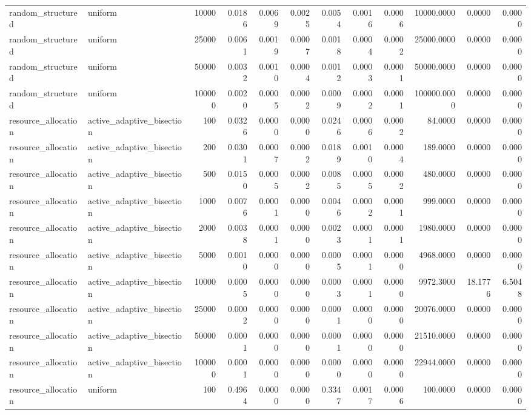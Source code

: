 \begin{tabular}{llrrrrrrrrrr}
random_structured & uniform & 10000 & 0.0186 & 0.0069 & 0.0025 & 0.0054 & 0.0016 & 0.0006 & 10000.0000 & 0.0000 & 0.0000 \\
random_structured & uniform & 25000 & 0.0061 & 0.0019 & 0.0007 & 0.0018 & 0.0004 & 0.0002 & 25000.0000 & 0.0000 & 0.0000 \\
random_structured & uniform & 50000 & 0.0032 & 0.0010 & 0.0004 & 0.0012 & 0.0003 & 0.0001 & 50000.0000 & 0.0000 & 0.0000 \\
random_structured & uniform & 100000 & 0.0020 & 0.0005 & 0.0002 & 0.0009 & 0.0002 & 0.0001 & 100000.0000 & 0.0000 & 0.0000 \\
resource_allocation & active_adaptive_bisection & 100 & 0.0326 & 0.0000 & 0.0000 & 0.0246 & 0.0006 & 0.0002 & 84.0000 & 0.0000 & 0.0000 \\
resource_allocation & active_adaptive_bisection & 200 & 0.0301 & 0.0007 & 0.0002 & 0.0189 & 0.0010 & 0.0004 & 189.0000 & 0.0000 & 0.0000 \\
resource_allocation & active_adaptive_bisection & 500 & 0.0150 & 0.0005 & 0.0002 & 0.0085 & 0.0005 & 0.0002 & 480.0000 & 0.0000 & 0.0000 \\
resource_allocation & active_adaptive_bisection & 1000 & 0.0076 & 0.0001 & 0.0000 & 0.0046 & 0.0002 & 0.0001 & 999.0000 & 0.0000 & 0.0000 \\
resource_allocation & active_adaptive_bisection & 2000 & 0.0038 & 0.0001 & 0.0000 & 0.0023 & 0.0001 & 0.0001 & 1980.0000 & 0.0000 & 0.0000 \\
resource_allocation & active_adaptive_bisection & 5000 & 0.0010 & 0.0000 & 0.0000 & 0.0005 & 0.0001 & 0.0000 & 4968.0000 & 0.0000 & 0.0000 \\
resource_allocation & active_adaptive_bisection & 10000 & 0.0005 & 0.0000 & 0.0000 & 0.0003 & 0.0001 & 0.0000 & 9972.3000 & 18.1776 & 6.5048 \\
resource_allocation & active_adaptive_bisection & 25000 & 0.0002 & 0.0000 & 0.0000 & 0.0001 & 0.0000 & 0.0000 & 20076.0000 & 0.0000 & 0.0000 \\
resource_allocation & active_adaptive_bisection & 50000 & 0.0001 & 0.0000 & 0.0000 & 0.0001 & 0.0000 & 0.0000 & 21510.0000 & 0.0000 & 0.0000 \\
resource_allocation & active_adaptive_bisection & 100000 & 0.0001 & 0.0000 & 0.0000 & 0.0000 & 0.0000 & 0.0000 & 22944.0000 & 0.0000 & 0.0000 \\
resource_allocation & uniform & 100 & 0.4964 & 0.0000 & 0.0000 & 0.3347 & 0.0017 & 0.0006 & 100.0000 & 0.0000 & 0.0000 \\

\end{tabular}

